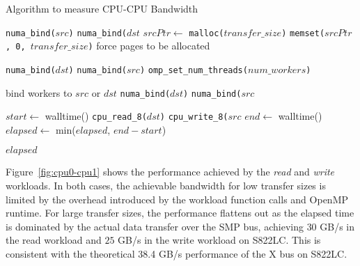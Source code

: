 \begin{algorithm}
    \caption{Algorithm to measure CPU-CPU Bandwidth}
    \label{alg:explicit-cpu-cpu}
    \begin{algorithmic}[1]
    \Statex
        \State \Return 
    \EndFunction
    \Statex
        \State \Return 
    \EndFunction
    \Statex
            \State \texttt{numa\_bind($src$)}
        \Else
            \State \texttt{numa\_bind($dst$}
        \EndIf
        \State $srcPtr \gets$ \texttt{malloc($transfer\_size$)}
        \State \texttt{memset($srcPtr$, 0, $transfer\_size$)} \Comment force pages to be allocated

            \State \texttt{numa\_bind($dst$)}
        \Else
            \State \texttt{numa\_bind($src$)}
        \EndIf
        \State \texttt{omp\_set\_num\_threads($num\_workers$)}
        \Statex
        
         \Comment bind workers to $src$ or $dst$
                \State \texttt{numa\_bind($dst$)}
            \Else
                \State \texttt{numa\_bind($src$}
            \EndIf
        \EndFor

        \State $start \gets$ walltime()
            \State \texttt{cpu\_read\_8($dst$)}
        \Else
            \State \texttt{cpu\_write\_8($src$}
        \EndIf
        \State $end \gets$ walltime()
        \State $elapsed \gets$ min($elapsed$, $end-start$)

        \State \Return $elapsed$
    \EndFunction

    \end{algorithmic}
\end{algorithm}

Figure~\ref{fig:cpu0-cpu1} shows the performance achieved by the \textit{read} and \textit{write} workloads.
In both cases, the achievable bandwidth for low transfer sizes is limited by the overhead introduced by the workload function calls and OpenMP runtime.
For large transfer sizes, the performance flattens out as the elapsed time is dominated by the actual data transfer over the SMP bus, achieving $30$ GB/s in the read workload and $25$ GB/s in the write workload on S822LC.
This is consistent with the theoretical 38.4 GB/s performance of the X bus on S822LC.

